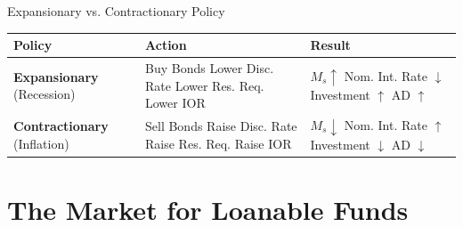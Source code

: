 \documentclass[aspectratio=169]{beamer}
\begin{document}
\begin{frame}{Expansionary vs. Contractionary Policy}
    \begin{table}[]
        \begin{tabular}{@{}p{3.5cm}p{4cm}p{4cm}@{}}
            \toprule
            \textbf{Policy} & \textbf{Action} & \textbf{Result} \\ \midrule
            \textbf{Expansionary} \newline (Recession) & Buy Bonds \newline Lower Disc. Rate \newline Lower Res. Req. \newline Lower IOR & $M_s \uparrow$ \newline Nom. Int. Rate $\downarrow$ \newline Investment $\uparrow$ \newline AD $\uparrow$ \\ \midrule
            \textbf{Contractionary} \newline (Inflation) & Sell Bonds \newline Raise Disc. Rate \newline Raise Res. Req. \newline Raise IOR & $M_s \downarrow$ \newline Nom. Int. Rate $\uparrow$ \newline Investment $\downarrow$ \newline AD $\downarrow$ \\ \bottomrule
        \end{tabular}
    \end{table}
\end{frame}

\section{The Market for Loanable Funds}
\end{document}
